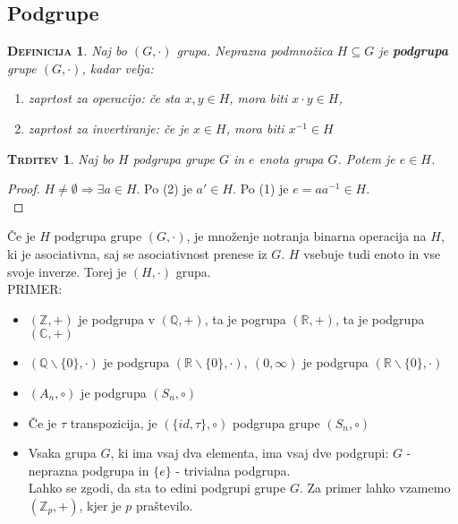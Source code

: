 \documentclass[a4paper,12pt]{article}
\newtheorem*{trditev}{\textsc{Trditev}}
\newtheorem*{definicija}{\textsc{Definicija}}
\begin{document}
\newpage

\begin{center}
\subsection{Podgrupe}
\end{center}

\begin{definicija}
Naj bo $(G,\cdot)$ grupa. Neprazna podmnožica $H\subseteq G$ je \textbf{podgrupa} grupe $(G,\cdot)$, kadar velja:
\begin{enumerate}
\item[(1)] zaprtost za operacijo: če sta $x,y\in H$, mora biti $x\cdot y\in H$,
\item[(2)] zaprtost za invertiranje: če je $x\in H$, mora biti $x^{-1}\in H$\\
\end{enumerate}
\end{definicija}

\begin{trditev}
Naj bo $H$ podgrupa grupe $G$ in $e$ enota grupa $G$. Potem je $e\in H$.\\
\end{trditev}

\begin{proof}
$H\neq \emptyset \Rightarrow \exists a \in H$. Po (2) je $a'\in H$. Po (1) je $e=aa^{-1}\in H$. \\
\end{proof}

\noindent Če je $H$ podgrupa grupe $(G,\cdot)$, je množenje notranja binarna operacija na $H$, ki je asociativna, saj se asociativnost prenese iz $G$. $H$ vsebuje tudi enoto in vse svoje inverze. Torej je $(H,\cdot)$ grupa.\\

\noindent PRIMER:
\begin{itemize}
\item $(\mathbb{Z},+)$ je podgrupa v $(\mathbb{Q},+)$, ta je pogrupa $(\mathbb{R},+)$, ta je podgrupa $(\mathbb{C},+)$
\item $(\mathbb{Q} \backslash \{0\},\cdot)$ je podgrupa $(\mathbb{R} \backslash \{0\},\cdot),~(0,\infty)$ je podgrupa $(\mathbb{R} \backslash \{0\},\cdot)$
\item $(A_n,\circ)$ je podgrupa $(S_n,\circ)$
\item Če je $\tau$ transpozicija, je $(\{id,\tau\},\circ)$ podgrupa grupe $(S_n,\circ)$
\item Vsaka grupa $G$, ki ima vsaj dva elementa, ima vsaj dve podgrupi: \linebreak $G$ - neprazna podgrupa in $\{e\}$ - trivialna podgrupa. \\

Lahko se zgodi, da sta to edini podgrupi grupe $G$. Za primer lahko vzamemo $(\mathbb{Z}_p,+)$, kjer je $p$ praštevilo.\\
\end{itemize}
\end{document}
